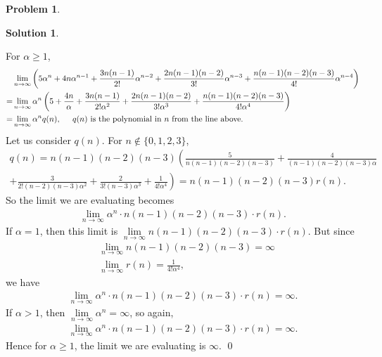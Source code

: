 \documentclass{book}
\theoremstyle{definition}
\newtheorem*{prob*}{Problem}
\newtheorem*{sln*}{Solution}
\begin{document}
\begin{prob*}
\begin{sln*}
\begin{enumerate}
			For $\alpha \geq 1$,
			\begin{align*}
			&\lim\limits_{n\to \infty} \left(    5\alpha^n + 4n\alpha^{n-1} + \frac{3n(n-1)}{2!}\alpha^{n-2} + \frac{2n(n-1)(n-2)}{3!}\alpha^{n-3} + \frac{n(n-1)(n-2)(n-3)}{4!}\alpha^{n-4} \right)\\
			= & \lim\limits_{n\to \infty}\alpha^n  \left(    5 + \frac{4n}{\alpha} + \frac{3n(n-1)}{2!\alpha^2} + \frac{2n(n-1)(n-2)}{3!\alpha^3} + \frac{n(n-1)(n-2)(n-3)}{4!\alpha^4} \right)\\
			= & \lim\limits_{n\to\infty} \alpha^n q(n), \hspace{0.5cm}\text{$q(n)$ is the polynomial in $n$ from the line above.}
			\end{align*}
			Let us consider $q(n)$. For $n \notin \{0,1,2,3 \}$,
			\begin{align*}
			q(n) = n(n-1)(n-2)(n-3)\left( \frac{5}{n(n-1)(n-2)(n-3)} + \frac{4}{(n-1)(n-2)(n-3)\alpha} \right. \\\left.+ \frac{3}{2!(n-2)(n-3)\alpha^2} + \frac{2}{3!(n-3)\alpha^3} + \frac{1}{4!\alpha^4}\right) = n(n-1)(n-2)(n-3)r(n).
			\end{align*}
			So the limit we are evaluating becomes
			\begin{align*}
			\lim\limits_{n\to\infty}\alpha^n \cdot n(n-1)(n-2)(n-3) \cdot r(n).
			\end{align*}
			If $\alpha = 1$, then this limit is $\lim\limits_{n\to\infty}n(n-1)(n-2)(n-3)\cdot r(n)$. But since
			\begin{align*}
			&\lim\limits_{n\to\infty}n(n-1)(n-2)(n-3) = \infty\\
			&\lim\limits_{n\to\infty}r(n) = \frac{1}{4!\alpha^4},
			\end{align*}
			we have
			\begin{align*}
			\lim\limits_{n\to\infty}\alpha^n \cdot n(n-1)(n-2)(n-3) \cdot r(n) = \infty.
			\end{align*}
			If $\alpha > 1$, then $\lim\limits_{n\to\infty}\alpha^n = \infty$, so again,
			\begin{align*}
			\lim\limits_{n\to\infty}\alpha^n \cdot n(n-1)(n-2)(n-3) \cdot r(n) = \infty.
			\end{align*}
			Hence for $\alpha \geq 1$, the limit we are evaluating is $\infty$. \qed
			
			\newpage
			

\end{enumerate}
\end{sln*}
\end{prob*}
\end{document}
